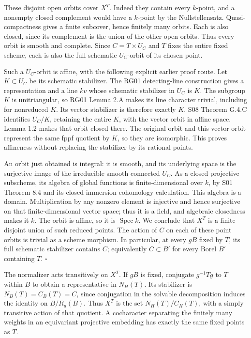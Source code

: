 \documentclass[11pt,a4paper,openany]{report}
\newcounter{none}
\begin{document}
These disjoint open orbits cover \(X^T\). Indeed they contain every \(k\)-point, and a nonempty closed complement would have a \(k\)-point by the Nullstellensatz. Quasi-compactness gives a finite subcover, hence finitely many orbits. Each is also closed, since its complement is the union of the other open orbits. Thus every orbit is smooth and complete. Since \(C=T\times U_C\) and \(T\) fixes the entire fixed scheme, each is also the full schematic \(U_C\)-orbit of its chosen point.

Such a \(U_C\)-orbit is affine, with the following explicit earlier proof route. Let \(K\subset U_C\) be its schematic stabilizer. The RG01 detecting-line construction gives a representation and a line \(kv\) whose schematic stabilizer in \(U_C\) is \(K\). The subgroup \(K\) is unitriangular, so RG01 Lemma 2.A makes its line character trivial, including for nonreduced \(K\). Its vector stabilizer is therefore exactly \(K\). S08 Theorem G.4.C identifies \(U_C/K\), retaining the entire \(K\), with the vector orbit in affine space. Lemma 1.2 makes that orbit closed there. The original orbit and this vector orbit represent the same fppf quotient by \(K\), so they are isomorphic. This proves affineness without replacing the stabilizer by its rational points.

An orbit just obtained is integral: it is smooth, and its underlying space is the surjective image of the irreducible smooth connected \(U_C\). As a closed projective subscheme, its algebra of global functions is finite-dimensional over \(k\), by S01 Theorem 8.4 and its closed-immersion cohomology calculation. This algebra is a domain. Multiplication by any nonzero element is injective and hence surjective on that finite-dimensional vector space; thus it is a field, and algebraic closedness makes it \(k\). The orbit is affine, so it is \(\operatorname{Spec}k\). We conclude that \(X^T\) is a finite disjoint union of such reduced points. The action of \(C\) on each of these point orbits is trivial as a scheme morphism. In particular, at every \(gB\) fixed by \(T\), its full schematic stabilizer contains \(C\); equivalently \(C\subset B'\) for every Borel \(B'\) containing \(T\). \(\square\)

The normalizer acts transitively on \(X^T\). If \(gB\) is fixed, conjugate \(g^{-1}Tg\) to \(T\) within \(B\) to obtain a representative in \(N_H(T)\). Its stabilizer is \(N_B(T)=C_B(T)=C\), since conjugation in the solvable decomposition induces the identity on \(B/R_u(B)\). Thus \(X^T\) is the set \(N_H(T)/C_H(T)\), with a simply transitive action of that quotient. A cocharacter separating the finitely many weights in an equivariant projective embedding has exactly the same fixed points as \(T\).
\end{document}

